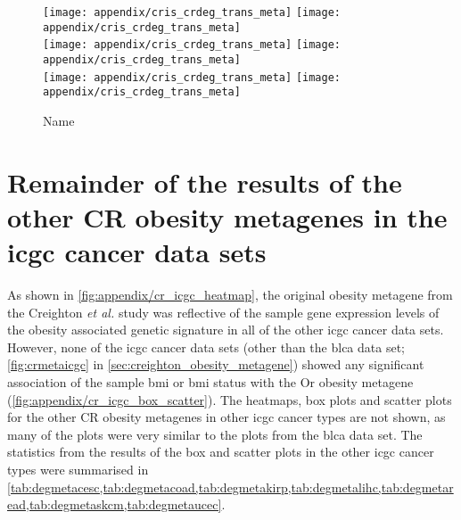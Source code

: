 \begin{appendices}
	\begin{figure}[htpb]
		\ContinuedFloat
		\captionsetup{list=off,format=cont}
		\centering
		\texttt{[image: appendix/cris\_crdeg\_trans\_meta]}
		\hfill
		\texttt{[image: appendix/cris\_crdeg\_trans\_meta]}\\
		\texttt{[image: appendix/cris\_crdeg\_trans\_meta]}
		\hfill
		\texttt{[image: appendix/cris\_crdeg\_trans\_meta]}\\
		\texttt{[image: appendix/cris\_crdeg\_trans\_meta]}
		\hfill
		\texttt{[image: appendix/cris\_crdeg\_trans\_meta]}\\
		\caption{Name}
	\end{figure}

	\section{Remainder of the results of the other CR obesity metagenes in the \gls{icgc} cancer data sets}
	\label{sec:rest_of_the_cr_icgc_cancer_heatmap_results}

	As shown in \cref{fig:appendix/cr_icgc_heatmap}, the original obesity metagene from the Creighton \textit{et al.} study was reflective of the sample gene expression levels of the obesity associated genetic signature in all of the other \gls{icgc} cancer data sets.
	However, none of the \gls{icgc} cancer data sets (other than the \gls{blca} data set; \cref{fig:crmetaicgc} in \cref{sec:creighton_obesity_metagene}) showed any significant association of the sample \gls{bmi} or \gls{bmi} status with the Or obesity metagene (\cref{fig:appendix/cr_icgc_box_scatter}).
	The heatmaps, box plots and scatter plots for the other CR obesity metagenes in other \gls{icgc} cancer types are not shown, as many of the plots were very similar to the plots from the \gls{blca} data set.
	The statistics from the results of the box and scatter plots in the other \gls{icgc} cancer types were summarised in \cref{tab:degmetacesc,tab:degmetacoad,tab:degmetakirp,tab:degmetalihc,tab:degmetaread,tab:degmetaskcm,tab:degmetaucec}.


\end{appendices}
